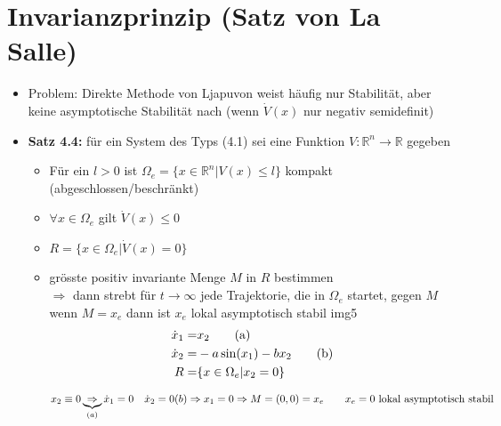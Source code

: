\documentclass[ngerman]{tudscrreprt}
\begin{document}
\section{Invarianzprinzip (Satz von La Salle)}
\begin{itemize}
\item Problem: Direkte Methode von Ljapuvon weist häufig nur Stabilität, aber keine asymptotische Stabilität nach (wenn $\dot V(x)$ nur negativ semidefinit)
\item \textbf{Satz 4.4:} für ein System des Typs (4.1) sei eine Funktion $V: \mathbb{R}^n \rightarrow \mathbb{R}$ gegeben
\begin{itemize}
\item Für ein $l > 0$ ist $\Omega_e = \{ x\in \mathbb{R}^n | V(x) \le l \}$ kompakt (abgeschlossen/beschränkt)
\item $\forall x \in \Omega_e$ gilt $\dot V(x) \le 0$
\item $R = \{ x\in \Omega_e | \dot V(x) = 0\}$
\item grösste positiv invariante Menge $M$ in $R$ bestimmen\\
$\Rightarrow$ dann strebt für $t\to \infty$ jede Trajektorie, die in $\Omega_e$ startet, gegen $M$ \\wenn $M= x_e$ dann ist $x_e$ lokal asymptotisch stabil img5
\begin{align}
\dot x_1 =& x_2\tag{a}\\
\dot x_2 =& -a \sin(x_1) - bx_2\tag{b}\\
R = &\{ x\in \Omega_e | x_2 = 0\}\notag\\
\end{align}
$ 
x_2 \equiv 0 \underbrace{\Rightarrow}_{(a)} \dot x_1 = 0 \quad \dot x_2 = 0\\
(b) \Rightarrow  x_1 = 0 \Rightarrow M = (0,0) = x_e \qquad x_e = 0 \text{ lokal asymptotisch stabil }
$
\end{itemize}
\end{itemize}
\end{document}
